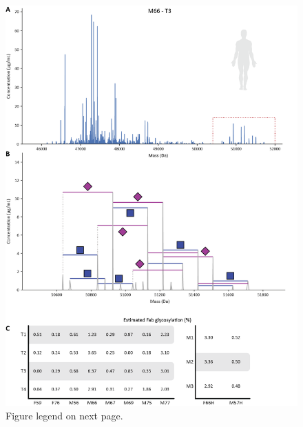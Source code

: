 \begin{subappendices}
  \begin{figure}[!p]
    \center
    \includegraphics[]{Chapter.3/Figures/fs2.png}
    \captionsetup{singlelinecheck = false, format= hang}
    \caption{
      Figure legend on next page.
    }
    \label{fig:figs3.2}
  \end{figure}
  \addtocounter{figure}{-1}
  \begin{figure}[pt!]
    \caption{
}
\end{figure}
\end{subappendices}

